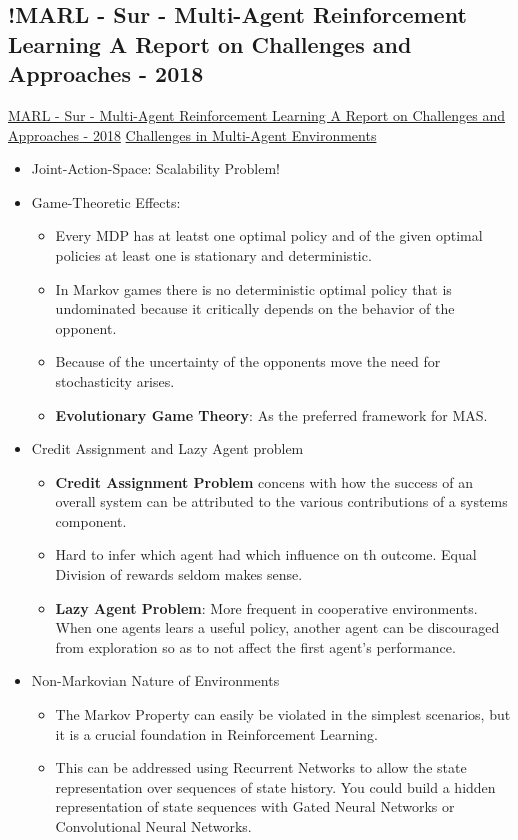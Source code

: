 \subsection{!MARL - Sur - Multi-Agent Reinforcement Learning A Report on Challenges and Approaches - 2018}
\href{https://arxiv.org/abs/1807.09427}{MARL - Sur - Multi-Agent Reinforcement Learning A Report on Challenges and Approaches - 2018}
\underline{Challenges in Multi-Agent Environments}
\begin{itemize}[noitemsep,nolistsep]
	\item Joint-Action-Space: Scalability Problem!
	\item Game-Theoretic Effects:
	\begin{itemize}[noitemsep,nolistsep]
		\item Every MDP has at leatst one optimal policy and of the given optimal policies at least one is stationary and deterministic.
		\item In Markov games there is no deterministic optimal policy that is undominated because it critically depends on the behavior of the opponent.
		\item Because of the uncertainty of the opponents move the need for stochasticity arises.
		\item \textbf{Evolutionary Game Theory}: As the preferred framework for MAS.
	\end{itemize}
	\item Credit Assignment and Lazy Agent problem
	\begin{itemize}[noitemsep,nolistsep]
		\item \textbf{Credit Assignment Problem} concens with how the success of an overall system can be attributed to the various contributions of a systems component.
		\item Hard to infer which agent had which influence on th outcome. Equal Division of rewards seldom makes sense.
		\item \textbf{Lazy Agent Problem}: More frequent in cooperative environments. When one agents lears a useful policy, another agent can be discouraged from exploration so as to not affect the first agent's performance.
	\end{itemize}
	\item Non-Markovian Nature of Environments
	\begin{itemize}[noitemsep,nolistsep]
		\item The Markov Property can easily be violated in the simplest scenarios, but it is a crucial foundation in Reinforcement Learning.
		\item This can be addressed using Recurrent Networks to allow the state representation over sequences of state history. You could build a hidden representation of state sequences with Gated Neural Networks or Convolutional Neural Networks.
	\end{itemize}
\end{itemize}
